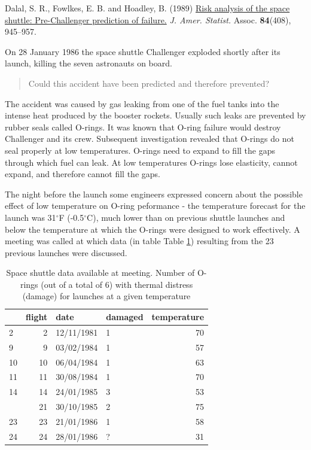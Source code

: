 \documentclass[
  british,
]{book}
\begin{document}
Dalal, S. R., Fowlkes, E. B. and Hoadley, B. (1989) \href{https://moodle.ucl.ac.uk/mod/resource/view.php?id=84313}{Risk analysis of the space shuttle: Pre-Challenger prediction of failure.}
\emph{J. Amer. Statist.} Assoc. \textbf{84}(408), 945--957.

On 28 January 1986 the space shuttle Challenger exploded shortly after its launch, killing the seven astronauts on board.

\begin{quote}
Could this accident have been predicted and therefore prevented?
\end{quote}

The accident was caused by gas leaking from one of the fuel tanks into the intense heat produced by the booster rockets. Usually such leaks are prevented by rubber seals called O-rings. It was known that O-ring failure would destroy Challenger and its crew. Subsequent investigation revealed that O-rings do not seal properly at low temperatures. O-rings need to expand to fill the gaps through which fuel can leak. At low temperatures O-rings lose elasticity, cannot expand, and therefore cannot fill the gaps.

The night before the launch some engineers expressed concern about the possible effect of low temperature on O-ring peformance - the temperature forecast for
the launch was 31\(^\circ\)F (-0.5\(^\circ\)C), much lower than on previous shuttle launches and below the temperature at which the O-rings were designed to work effectively. A meeting was called at which data (in table Table \ref{tab:tabshuttle1}) resulting from the 23 previous launches were discussed.

\begin{table}

\caption{\label{tab:tabshuttle1}Space shuttle data available at meeting. Number of O-rings (out of a total of 6) with thermal distress (damage) for launches at a given temperature}
\centering
\begin{tabular}[t]{lrllr}
\toprule
  & flight & date & damaged & temperature\\
\midrule
2 & 2 & 12/11/1981 & 1 & 70\\
9 & 9 & 03/02/1984 & 1 & 57\\
10 & 10 & 06/04/1984 & 1 & 63\\
11 & 11 & 30/08/1984 & 1 & 70\\
14 & 14 & 24/01/1985 & 3 & 53\\
\addlinespace
21 & 21 & 30/10/1985 & 2 & 75\\
23 & 23 & 21/01/1986 & 1 & 58\\
24 & 24 & 28/01/1986 & ? & 31\\
\bottomrule
\end{tabular}
\end{table}
\end{document}
